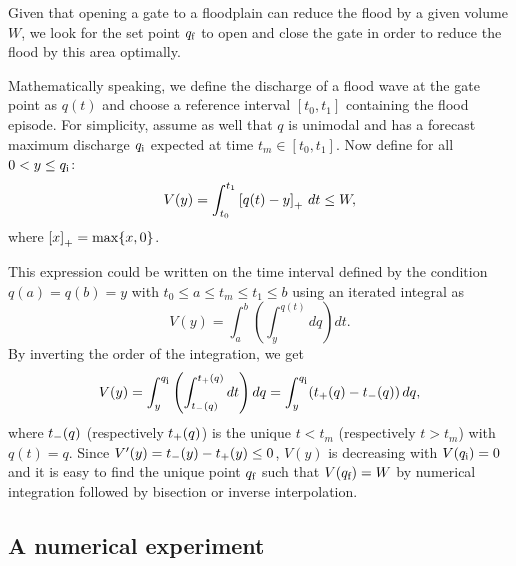 Given that opening a gate to a floodplain can reduce the flood by a given volume $W$, we look for the set point $q_{\mbox{\scriptsize f}}$ to
open and close the gate in order to reduce the flood by this area optimally.

Mathematically speaking, we define the discharge of a flood wave at the gate point as $q(t)$ and
choose a reference interval $[t_0,t_1]$ containing the flood episode.
For simplicity, assume as well that $q$ is unimodal and has a forecast maximum discharge $q_{\mbox{\scriptsize i}}$
expected at time $t_m\in[t_0,t_1]$.
Now define for all $0<y\leq q_{\mbox{\scriptsize i}}$:
\begin{equation}
V(y)=\int_{t_0}^{t_1}\left[q(t)-y\right]_{+}\, dt\leq W,
\end{equation}
where $\left[x\right]_{+} =\max\{x,0\}$.

This expression could be
written on the time interval defined by the condition $q(a)=q(b)=y$ with $t_0\leq a\leq t_m\leq t_1\leq b$
using an iterated integral as
\[
V(y)=
\int_{a}^{b}\left(\int_{y}^{q(t)}dq\right)dt.
\]
By inverting the order of the integration, we get
\begin{equation}
V(y)=
\int_{y}^{q_{\mbox{\scriptsize i}}}\left(\int_{t_{-}(q)}^{t_{+}(q)}dt\right)dq=
\int_{y}^{q_{\mbox{\scriptsize i}}}(t_{+}(q)-t_{-}(q))\, dq,	
\end{equation}
where $t_{-}(q)$
(respectively $t_{+}(q)$) is the unique $t<t_{m}$ (respectively
$t>t_{m}$) with $q(t)=q$. Since $V'(y)=t_{-}(y)-t_{+}(y)\leq0$,
$V(y)$ is decreasing with $V(q_{\mbox{\scriptsize i}})=0$ and it is easy to find the
unique point $q_{\mbox{\scriptsize f}}$ such that $V(q_{\mbox{\scriptsize f}})=W$ by numerical integration
followed by bisection or inverse interpolation.




\subsection{A numerical experiment}

